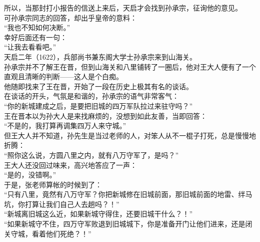 \begin{multicols}{\theparacolNo}
所以，当那封打小报告的信送上来后，天启才会找到孙承宗，征询他的意见。\\

可孙承宗同志的回答，却出乎皇帝的意料：\\

“我也不知如何决断。”\\

幸好后面还有一句：\\

“让我去看看吧。”\\

天启二年（1622），兵部尚书兼东阁大学士孙承宗来到山海关。\\

孙承宗并不了解王在晋，但到山海关和八里铺转了一圈后，他对王大人便有了一个直观且清晰的判断——这人是个白痴。\\

他随即找来了王在晋，开始了一段在历史上极其有名的谈话。\\

在谈话的开头，气氛是和谐的，孙承宗的语气非常客气：\\

“你的新城建成之后，是要把旧城的四万军队拉过来驻守吗？”\\

王在晋本以为孙大人是来找麻烦的，没想到如此友善，当即回答：\\

“不是的，我打算再调集四万人来守城。”\\

但王大人并不知道，孙先生是当过老师的人，对笨人从不一棍子打死，总是慢慢地折腾：\\

“照你这么说，方圆八里之内，就有八万守军了，是吗？”\\

王大人还没回过味来，高兴地答应了一声：\\

“是的，没错啊。”\\

于是，张老师算帐的时候到了：\\

“只有八里，竟然有八万守军？你把新城修在旧城前面，那旧城前面的地雷、绊马坑，你打算让我们自己人去趟吗？！”\\

“新城离旧城这么近，如果新城守得住，还要旧城干什么？！”\\

“如果新城守不住，四万守军败退到旧城城下，你是准备开门让他们进来，还是闭关守城，看着他们死绝？！”\\


\end{multicols}
